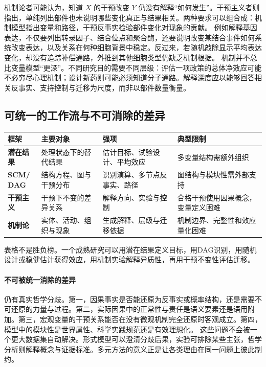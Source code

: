 机制论者可能认为，知道 $X$ 的干预改变 $Y$ 仍没有解释“如何发生”。干预主义者则指出，单纯列出部件也未说明哪些变化真正与结果相关。两种要求可以组合成：机制模型指出变量和路径，干预反事实检验部件变化对现象的贡献。
例如解释基因表达，不仅要列出转录因子、结合位点和聚合酶，还要说明改变某结合事件如何系统改变表达，以及关系在何种细胞背景中稳定。反过来，若随机敲除显示平均表达变化，却没有追踪补偿通路，外推到其他细胞类型仍缺乏机制根据。
机制并不总比变量模型“更深”。不同研究目的需要不同层级：评估一项政策的总体净效应可能不必穷尽心理机制；设计新药则可能必须知道分子通路。解释深度应以能够回答相关反事实、支持控制与迁移为尺度，而非以部件数量衡量。

\subsection{可统一的工作流与不可消除的差异}

\begin{center}
\small
\begin{tabularx}{\textwidth}{>{\bfseries}p{1.7cm}X X X}
\toprule
框架 & 主要对象 & 强项 & 典型限制\\
\midrule
潜在结果 & 处理状态下的替代结果 & 估计目标、试验设计、平均效应 & 多变量结构需额外组织\\
\shortstack[l]{SCM/\\DAG} & 结构方程、图与干预分布 & 识别演算、多节点反事实、路径 & 图结构与模块性需外部支持\\
干预主义 & 干预下不变的差异关系 & 解释方向、实验与控制 & 合格干预使用因果概念，变量定义困难\\
机制论 & 实体、活动、组织与现象 & 生成解释、层级与迁移依据 & 机制边界、完整性和效应量化困难\\
\bottomrule
\end{tabularx}
\end{center}

表格不是胜负榜。一个成熟研究可以用潜在结果定义目标，用DAG识别，用随机设计或稳健估计获得效应，用机制实验解释异质性，再用干预不变性评估迁移。

\paragraph{不可被统一消除的差异}

仍有真实哲学分歧。第一，因果事实是否能还原为反事实或概率结构，还是需要不可还原的力量与过程。第二，实际因果中的正常性与责任是语义要素还是语用附加。第三，宏观变量的干预关系能否在没有微观机制完全还原时客观成立。第四，模型中的模块性是世界属性、科学实践规范还是有效理想化。
这些问题不会被一个更大数据集自动解决。形式模型可以澄清分歧后果，实验可排除某些主张，哲学分析则解释概念与证据标准。多元方法的意义正是让各类理由在同一问题上彼此制约。

